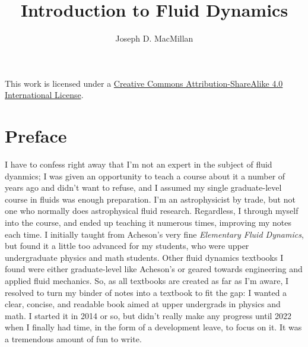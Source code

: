 \documentclass[10pt, a5paper, twoside, openany]{memoir}
\title{Introduction to Fluid Dynamics}
\author{Joseph D. MacMillan}
\date{}
\begin{document}
\frontmatter

\maketitle

{\small This work is licensed under a \href{https://creativecommons.org/licenses/by-sa/4.0/}{Creative Commons Attribution-ShareAlike 4.0 International License}.}



\newpage

\tableofcontents

\chapter{Preface}

I have to confess right away that I'm not an expert in the subject of fluid dyanmics; I was given an opportunity to teach a course about it a number of years ago and didn't want to refuse, and I assumed my single graduate-level course in fluids was enough preparation.  I'm an astrophysicist by trade, but not one who normally does astrophysical fluid research.  Regardless, I through myself into the course, and ended up teaching it numerous times, improving my notes each time.  I initially taught from Acheson's very fine \emph{Elementary Fluid Dynamics}, but found it a little too advanced for my students, who were upper undergraduate physics and math students.  Other fluid dynamics textbooks I found were either graduate-level like Acheson's or geared towards engineering and applied fluid mechanics.  So, as all textbooks are created as far as I'm aware, I resolved to turn my binder of notes into a textbook to fit the gap: I wanted a clear, concise, and readable book aimed at upper undergrads in physics and math.  I started it in 2014 or so, but didn't really make any progress until 2022 when I finally had time, in the form of a development leave, to focus on it.  It was a tremendous amount of fun to write.
\end{document}

